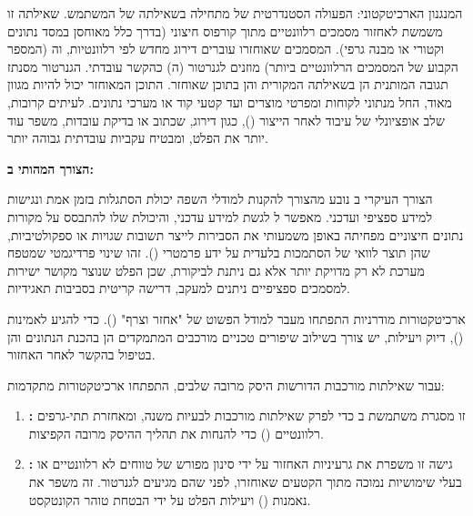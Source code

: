 המנגנון הארכיטקטוני: הפעולה הסטנדרטית של  מתחילה בשאילתה של המשתמש. שאילתה זו משמשת לאחזור מסמכים רלוונטיים מתוך קורפוס חיצוני (בדרך כלל מאוחסן במסד נתונים וקטורי או מבנה גרפי). המסמכים שאוחזרו עוברים דירוג מחדש לפי רלוונטיות, וה (המספר הקבוע של המסמכים הרלוונטיים ביותר) מוזנים לגנרטור (ה) כהקשר עובדתי. הגנרטור מסנתז תגובה המותנית הן בשאילתה המקורית והן בתוכן שאוחזר. התוכן המאוחזר יכול להיות מגוון מאוד, החל מנתוני לקוחות ומפרטי מוצרים ועד קטעי קוד או מערכי נתונים. לעיתים קרובות, שלב אופציונלי של עיבוד לאחר הייצור (), כגון דירוג, שכתוב או בדיקת עובדות, משפר עוד יותר את הפלט, ומבטיח עקביות עובדתית גבוהה יותר.

\textbf{הצורך המהותי ב:}

הצורך העיקרי ב נובע מהצורך להקנות למודלי השפה יכולת הסתגלות בזמן אמת ונגישות למידע ספציפי ועדכני.  מאפשר ל לגשת למידע עדכני, והיכולת שלו להתבסס על מקורות נתונים חיצוניים מפחיתה באופן משמעותי את הסבירות לייצר תשובות שגויות או ספקולטיביות, שהן תוצר לוואי של הסתמכות בלעדית על ידע פרמטרי (). זהו שינוי פרדיגמטי שמטפח מערכת לא רק מדויקת יותר אלא גם ניתנת לביקורת, שכן הפלט שנוצר מקושר ישירות למסמכים ספציפיים ניתנים למעקב, דרישה קריטית בסביבות תאגידיות.


ארכיטקטורות  מודרניות התפתחו מעבר למודל הפשוט של "אחזר וצרף" (). כדי להגיע לאמינות (), דיוק ויעילות, יש צורך בשילוב שיפורים טכניים מורכבים המתמקדים הן בהכנת הנתונים והן בטיפול בהקשר לאחר האחזור.

עבור שאילתות מורכבות הדורשות היסק מרובה שלבים, התפתחו ארכיטקטורות  מתקדמות:

\begin{enumerate}
  \item \textbf{:} זו מסגרת משתמשת ב כדי לפרק שאילתות מורכבות לבעיות משנה, ומאחזרת תתי-גרפים רלוונטיים () כדי להנחות את תהליך ההיסק מרובה הקפיצות\cite{zhang2024kragen}.
  \item \textbf{:} גישה זו משפרת את גרעיניות האחזור על ידי סינון מפורש של טווחים לא רלוונטיים או בעלי שימושיות נמוכה מתוך הקטעים שאוחזרו, לפני שהם מגיעים לגנרטור. זה משפר את נאמנות () ויעילות הפלט על ידי הבטחת טוהר הקונטקסט\cite{wang2023filco}.
\end{enumerate}

